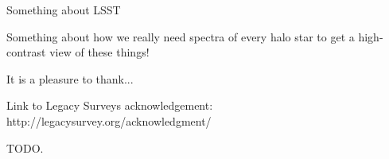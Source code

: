 \documentclass[RNAAS]{aastex63}
\begin{document}
Something about LSST

Something about how we really need spectra of every halo star to get a high-contrast view of these things!




\acknowledgements

It is a pleasure to thank...

Link to Legacy Surveys acknowledgement: http://legacysurvey.org/acknowledgment/




\appendix

TODO.

% 
% 
\end{document}
